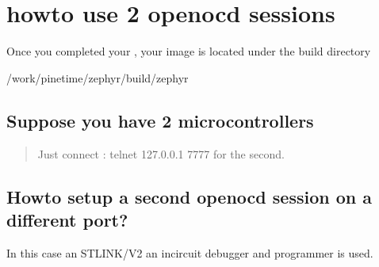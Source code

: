 \documentclass[letterpaper,10pt,english]{sphinxmanual}
\begin{document}
\section{howto use 2 openocd sessions}
\label{\detokenize{hacking/openocd:howto-use-2-openocd-sessions}}\label{\detokenize{hacking/openocd::doc}}
Once you completed your  , your image is located under the build directory

\begin{sphinxVerbatim}[commandchars=\\\{\}]
  \PYGZti{}/work/pinetime/zephyr/build/zephyr






\end{sphinxVerbatim}


\subsection{Suppose you have 2 microcontrollers}
\label{\detokenize{hacking/openocd:suppose-you-have-2-microcontrollers}}\begin{quote}

Just connect : telnet 127.0.0.1 7777 for the second.
\end{quote}


\subsection{Howto setup a second openocd session on a different port?}
\label{\detokenize{hacking/openocd:howto-setup-a-second-openocd-session-on-a-different-port}}
In this case an ST\sphinxhyphen{}LINK/V2 an in\sphinxhyphen{}circuit debugger and programmer is used.

\begin{sphinxVerbatim}[commandchars=\\\{\}]
             
\end{sphinxVerbatim}
\end{document}
